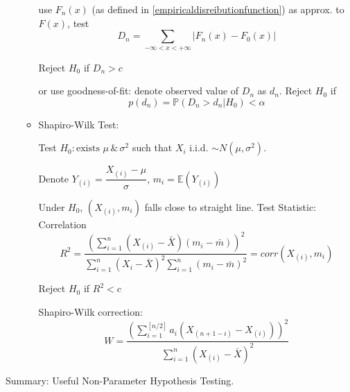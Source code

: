 \begin{itemize}
\begin{itemize}
        use $F_n(x)$ (as defined in \autoref{empiricaldisreibutionfunction}) as approx. to $F(x)$, test
        \begin{equation}
            D_n=\sum_{-\infty< x<+\infty}|F_n(x)-F_0(x)|
        \end{equation}

        Reject $H_0$ if $D_n>c$

        or use goodness-of-fit: denote observed value of $D_n$ as $d_n$. Reject $H_0$ if
        \begin{equation}
            p(d_n)=\mathbb{P}(D_n>d_n|H_0)<\alpha
        \end{equation}

        \item Shapiro-Wilk Test:
        
        Test $H_0:\text{exists }\mu\,\&\, \sigma^2$ such that $X_i$ i.i.d. $\sim N(\mu,\sigma^2)$.

        Denote $Y_{(i)}=\dfrac{X_{(i)}-\mu}{\sigma}$, $m_i=\mathbb{E}(Y_{(i)})$

        Under $H_0$, $(X_{(i)},m_i)$ falls close to straight line. Test Statistic: Correlation
        \begin{equation}
            R^2=\dfrac{\left(\sum_{i=1}^n(X_{(i)}-\bar{X})(m_i-\bar{m})\right)^2}{\sum_{i=1}^n(X_{i}-\bar{X})^2\sum_{i=1}^n(m_i-\bar{m})^2}=corr(X_{(i)},m_i)
        \end{equation}

        Reject $H_0$ if $R^2<c$

        Shapiro-Wilk correction:
        \begin{equation}
            W=\dfrac{\left(\sum_{i=1}^{[n/2]}a_i(X_{(n+1-i)}-X_{(i)})\right)^2}{\sum_{i=1}^n(X_{(i)}-\bar{X})^2}
        \end{equation}
    \end{itemize}
\end{itemize}

\begin{point}
    Summary: Useful Non-Parameter Hypothesis Testing.
\end{point}
\\
\\

